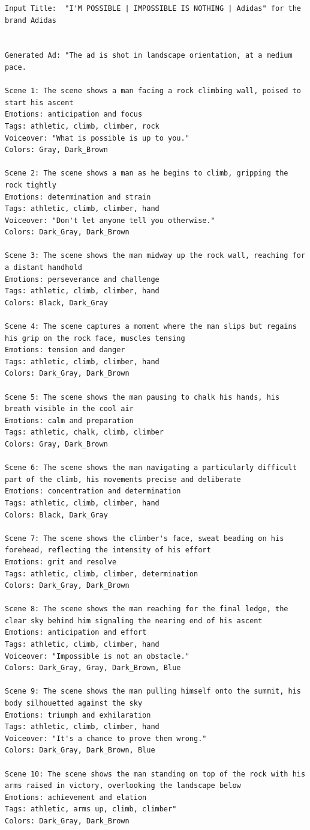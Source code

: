 \begin{lstlisting}[caption={Advertisement generated by Henry-SEED for an Adidas Ad. Original Ad: \url{https://www.youtube.com/watch?v=fujboh-W7Sk}},frame=single,breaklines=true,basicstyle=\tiny, label={lst:adidas}]
Input Title:  "I'M POSSIBLE | IMPOSSIBLE IS NOTHING | Adidas" for the brand Adidas


Generated Ad: "The ad is shot in landscape orientation, at a medium pace.

Scene 1: The scene shows a man facing a rock climbing wall, poised to start his ascent
Emotions: anticipation and focus
Tags: athletic, climb, climber, rock
Voiceover: "What is possible is up to you."
Colors: Gray, Dark_Brown

Scene 2: The scene shows a man as he begins to climb, gripping the rock tightly
Emotions: determination and strain
Tags: athletic, climb, climber, hand
Voiceover: "Don't let anyone tell you otherwise."
Colors: Dark_Gray, Dark_Brown

Scene 3: The scene shows the man midway up the rock wall, reaching for a distant handhold
Emotions: perseverance and challenge
Tags: athletic, climb, climber, hand
Colors: Black, Dark_Gray

Scene 4: The scene captures a moment where the man slips but regains his grip on the rock face, muscles tensing
Emotions: tension and danger
Tags: athletic, climb, climber, hand
Colors: Dark_Gray, Dark_Brown

Scene 5: The scene shows the man pausing to chalk his hands, his breath visible in the cool air
Emotions: calm and preparation
Tags: athletic, chalk, climb, climber
Colors: Gray, Dark_Brown

Scene 6: The scene shows the man navigating a particularly difficult part of the climb, his movements precise and deliberate
Emotions: concentration and determination
Tags: athletic, climb, climber, hand
Colors: Black, Dark_Gray

Scene 7: The scene shows the climber's face, sweat beading on his forehead, reflecting the intensity of his effort
Emotions: grit and resolve
Tags: athletic, climb, climber, determination
Colors: Dark_Gray, Dark_Brown

Scene 8: The scene shows the man reaching for the final ledge, the clear sky behind him signaling the nearing end of his ascent
Emotions: anticipation and effort
Tags: athletic, climb, climber, hand
Voiceover: "Impossible is not an obstacle."
Colors: Dark_Gray, Gray, Dark_Brown, Blue

Scene 9: The scene shows the man pulling himself onto the summit, his body silhouetted against the sky
Emotions: triumph and exhilaration
Tags: athletic, climb, climber, hand
Voiceover: "It's a chance to prove them wrong."
Colors: Dark_Gray, Dark_Brown, Blue

Scene 10: The scene shows the man standing on top of the rock with his arms raised in victory, overlooking the landscape below
Emotions: achievement and elation
Tags: athletic, arms up, climb, climber"
Colors: Dark_Gray, Dark_Brown
\end{lstlisting}






